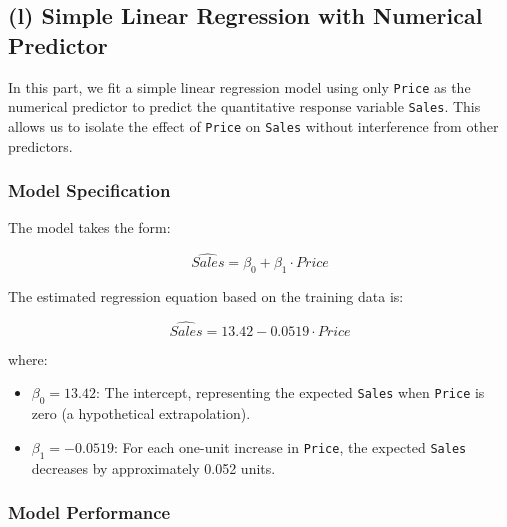 \documentclass[12pt]{article}
\begin{document}
\subsection*{(l) Simple Linear Regression with Numerical Predictor}

In this part, we fit a simple linear regression model using only \texttt{Price} as the numerical predictor to predict the quantitative response variable \texttt{Sales}. This allows us to isolate the effect of \texttt{Price} on \texttt{Sales} without interference from other predictors.

\subsubsection*{Model Specification}

The model takes the form:

\begin{equation*}
\widehat{Sales} = \beta_0 + \beta_1 \cdot Price
\end{equation*}

The estimated regression equation based on the training data is:

\begin{equation*}
\widehat{Sales} = 13.42 - 0.0519 \cdot Price
\end{equation*}

\noindent where:
\begin{itemize}
    \item $\beta_0 = 13.42$: The intercept, representing the expected \texttt{Sales} when \texttt{Price} is zero (a hypothetical extrapolation).
    \item $\beta_1 = -0.0519$: For each one-unit increase in \texttt{Price}, the expected \texttt{Sales} decreases by approximately 0.052 units.
\end{itemize}

\subsubsection*{Model Performance}
\end{document}
